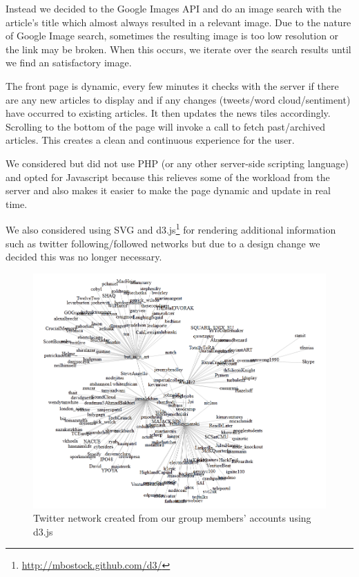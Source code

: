 \documentclass{report}
\begin{document}
    Instead we decided to the Google Images API and do an image search with the article's title which almost always resulted in a relevant image. Due to the nature of Google Image search, sometimes the resulting image is too low resolution or the link may be broken. When this occurs, we iterate over the search results until we find an satisfactory image.

    The front page is dynamic, every few minutes it checks with the server if there are any new articles to display and if any changes (tweets/word cloud/sentiment) have occurred to existing articles. It then updates the news tiles accordingly.
    Scrolling to the bottom of the page will invoke a call to fetch past/archived articles. This creates a clean and continuous experience for the user.

    We considered but did not use PHP (or any other server-side scripting language) and opted for Javascript because this relieves some of the workload from the server and also makes it easier to make the page dynamic and update in real time.

    We also considered using SVG and d3.js\footnote{\url{http://mbostock.github.com/d3/}} for rendering additional information such as twitter following/followed networks but due to a design change we decided this was no longer necessary.

		\begin{figure}
  	 \includegraphics[scale=0.6]{twnet.png}
  	 \caption{\label{fig:twnet} Twitter network created from our group members' accounts using d3.js}
  	\end{figure}
	
\end{document}
